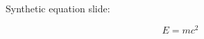 \documentclass[11pt,a4paper]{article}
\begin{document}
Synthetic equation slide: 

$$E=mc^2$$
\end{document}
